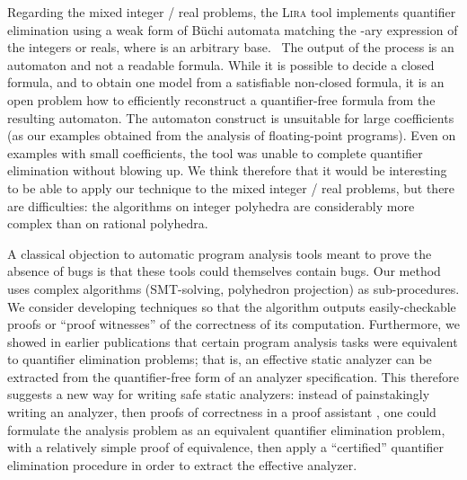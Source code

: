 Regarding the mixed integer / real problems, the \textsc{Lira} tool implements quantifier elimination using a weak form of B\"uchi automata matching the -ary expression of the integers or reals, where  is an arbitrary base.~\cite{Becker_et_al_CAV05} The output of the process  is an automaton and not a readable formula. While it is possible to decide a closed formula, and to obtain one model from a satisfiable non-closed formula, it is an open problem how to efficiently reconstruct a quantifier-free formula from the resulting automaton. The automaton construct is unsuitable for large coefficients (as our examples obtained from the analysis of floating-point programs). Even on examples with small coefficients, the tool was unable to complete quantifier elimination without blowing up. We think therefore that it would be interesting to be able to apply our technique to the mixed integer / real problems, but there are difficulties: the algorithms on integer polyhedra are considerably more complex than on rational polyhedra.

A classical objection to automatic program analysis tools meant to prove the absence of bugs is that these tools could themselves contain bugs. Our method uses complex algorithms (SMT-solving, polyhedron projection) as sub-procedures. We consider developing techniques so that the algorithm outputs easily-checkable proofs or ``proof witnesses'' of the correctness of its computation. Furthermore, we showed in earlier publications \cite{Monniaux_SAS07} that certain program analysis tasks were equivalent to quantifier elimination problems; that is, an effective static analyzer can be extracted from the quantifier-free form of an analyzer specification. This therefore suggests a new way for writing safe static analyzers: instead of painstakingly writing an analyzer, then proofs of correctness in a proof assistant \cite{Pich:these}, one could formulate the analysis problem as an equivalent quantifier elimination problem, with a relatively simple proof of equivalence, then apply a ``certified'' quantifier elimination procedure in order to extract the effective analyzer.


